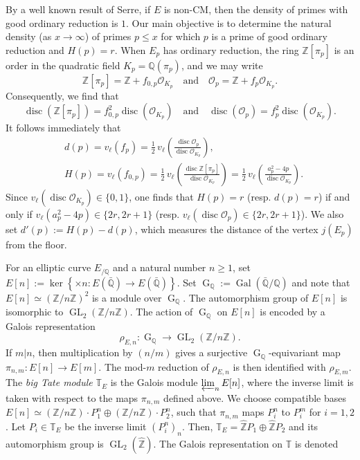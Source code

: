 \documentclass[table]{amsart}
\newcommand{\Z}{\mathbb{Z}}
\newcommand{\Q}{\mathbb{Q}}
\newcommand{\cO}{\mathcal{O}}
\newcommand{\op}[1]{\operatorname{#1}}
\numberwithin{equation}{section}
\begin{document}
\par By a well known result of Serre, if $E$ is non-CM, then the density of primes with good ordinary reduction is $1$. Our main objective is to determine the natural density (as \(x\to\infty\)) of primes \(p\le x\) for which $p$ is a prime of good ordinary reduction and \(H(p)=r\). When $E_p$ has ordinary reduction, the ring $\Z[\pi_p]$ is an order in the quadratic field $K_p=\Q(\pi_p)$, and we may write \[\Z[\pi_p]=\Z+f_{0,p}\cO_{K_p}\quad \text{and}\quad \cO_p=\Z+f_p\cO_{K_p}.\]Consequently, we find that \[\op{disc}(\Z[\pi_p])=f_{0,p}^{2}\op{disc}(\cO_{K_p})\quad \text{and}\quad \op{disc}(\cO_p)=f_p^{2}\op{disc}(\cO_{K_p}).\]It follows immediately that 
\begin{equation}\label{main disc eqn}\begin{split}
& d(p)=v_\ell(f_{p})=\tfrac12\, v_\ell\!\left(\frac{\op{disc}\cO_p}{\op{disc}\cO_{K_p}}\right),\\
& H(p)=v_\ell(f_{0,p})=\tfrac12\, v_\ell\!\left(\frac{\op{disc}\Z[\pi_p]}{\op{disc}\cO_{K_p}}\right)
   =\tfrac12\, v_\ell\!\left(\frac{a_p^{2}-4p}{\op{disc}\cO_{K_p}}\right).\end{split}
\end{equation}
\noindent Since $v_\ell\left(\op{disc}\cO_{K_p}\right)\in \{0,1\}$, one finds that $H(p)=r$ (resp. $d(p)=r$) if and only if $v_\ell(a_p^2-4p)\in \{2r, 2r+1\}$ (resp. $v_\ell(\op{disc}\cO_p)\in \{2r, 2r+1\}$). We also set $d'(p):=H(p)-d(p)$, which measures the distance of the vertex $j(E_p)$ from the floor. 
\par For an elliptic curve $E_{/\Q}$ and a natural number $n\geq 1$, set $E[n]:=\op{ker}\left\{\times n: E(\bar{\Q})\rightarrow E(\bar{\Q})\right\}$. Set $\op{G}_{\Q}:=\op{Gal}(\bar{\Q}/\Q)$ and note that $E[n]\simeq (\Z/n\Z)^2$ is a module over $\op{G}_{\Q}$. The automorphism group of $E[n]$ is isomorphic to $\op{GL}_2(\Z/n\Z)$. The action of $\op{G}_{\Q}$ on $E[n]$ is encoded by a Galois representation 
\[\rho_{E,n}:\op{G}_{\Q}\rightarrow \op{GL}_2(\Z/n\Z).\] If $m|n$, then multiplication by $(n/m)$ gives a surjective $\op{G}_{\Q}$-equivariant map $\pi_{n,m}:E[n]\rightarrow E[m]$. The mod-$m$ reduction of $\rho_{E,n}$ is then identified with $\rho_{E,m}$. The \emph{big Tate module} $\mathbb{T}_E$ is the Galois module $\varprojlim_n E[n]$, where the inverse limit is taken with respect to the maps $\pi_{n, m}$ defined above. We choose compatible bases $E[n]\simeq (\Z/n\Z)\cdot P_{1}^n\oplus (\Z/n\Z)\cdot P_{2}^n$, such that $\pi_{n,m}$ maps $P_i^n$ to $P_i^m$ for $i=1,2$. Let $P_i\in \mathbb{T}_E$ be the inverse limit $(P_i^n)_n$. Then, $\mathbb{T}_E=\widehat{\Z}P_1\oplus \widehat{\Z}P_2$ and its automorphism group is $\op{GL}_2(\widehat{\Z})$. The Galois representation on $\mathbb{T}$ is denoted 
\end{document}
